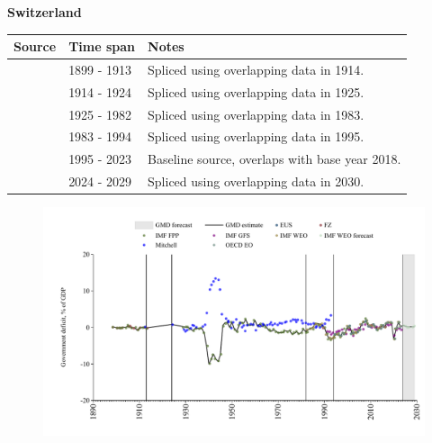 \documentclass[12pt,a4paper,landscape]{article}
\begin{document}
\begin{adjustbox}{max totalsize={\paperwidth}{\paperheight},center}
\begin{minipage}[t][\textheight][t]{\textwidth}
\vspace*{0.5cm}
{}
\begin{center}
{\Large\bfseries Switzerland}
\end{center}
\vspace{0.5cm}
\begin{table}[H]
\centering
\small
\begin{tabular}{|l|l|l|}
\hline
\textbf{Source} & \textbf{Time span} & \textbf{Notes} \\
\hline
\rowcolor{white}\cite{IMF_FPP}& 1899 - 1913 &Spliced using overlapping data in 1914.\\
\rowcolor{lightgray}\cite{Mitchell}& 1914 - 1924 &Spliced using overlapping data in 1925.\\
\rowcolor{white}\cite{IMF_FPP}& 1925 - 1982 &Spliced using overlapping data in 1983.\\
\rowcolor{lightgray}\cite{IMF_WEO}& 1983 - 1994 &Spliced using overlapping data in 1995.\\
\rowcolor{white}\cite{EUS}& 1995 - 2023 &Baseline source, overlaps with base year 2018.\\
\rowcolor{lightgray}\cite{IMF_WEO_forecast}& 2024 - 2029 &Spliced using overlapping data in 2030.\\
\hline
\end{tabular}
\end{table}
\begin{figure}[H]
\centering
\includegraphics[width=\textwidth,height=0.6\textheight,keepaspectratio]{graphs/CHE_govdef_GDP.pdf}
\end{figure}
\end{minipage}
\end{adjustbox}
\end{document}
